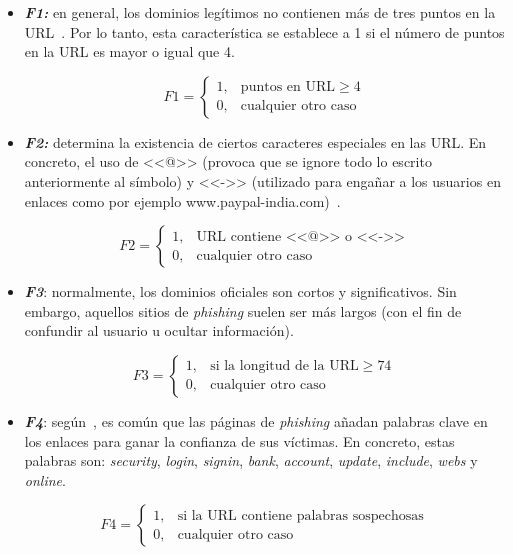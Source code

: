 \begin{itemize}
	\item \textit{\textbf{F1:}} en general, los dominios legítimos no contienen más de tres puntos en la URL~\cite{featuresPhishing2018Gupta}. Por lo tanto, esta característica se establece a 1 si el número de puntos en la URL es mayor o igual que 4.
	
	\[F1 = \left\{ \begin{array}{lr} 1, & \text{puntos en URL} \ge 4\\ 
	0, & \text{cualquier otro caso} \label{eqn:phishing_f1} \end{array} \right. \] 
	
	\item \textit{\textbf{F2:}} determina la existencia de ciertos caracteres especiales en las URL. En concreto, el uso de <<@>> (provoca que se ignore todo lo escrito anteriormente al símbolo) y <<->> (utilizado para engañar a los usuarios en enlaces como por ejemplo www.paypal-india.com)~\cite{featuresPhishing2018Gupta}.
	
	\[F2 = \left\{ \begin{array}{lr} 1, & \text{URL contiene <<@>> o <<->>}\\ 
	0, & \text{cualquier otro caso} \label{eqn:phishing_f2} \end{array} \right. \]
	
	\item \textit{\textbf{F3}}: normalmente, los dominios oficiales son cortos y significativos. Sin embargo, aquellos sitios de \textit{phishing} suelen ser más largos (con el fin de confundir al usuario u ocultar información).
	
	\[F3 = \left\{ \begin{array}{lr} 1, & \text{si la longitud de la URL} \ge 74\\ 
	0, & \text{cualquier otro caso} \label{eqn:phishing_f3} \end{array} \right. \]
	
	\item \textit{\textbf{F4}}: según~\cite{featuresPhishing2018Gupta}, es común que las páginas de \textit{phishing} añadan palabras clave en los enlaces para ganar la confianza de sus víctimas. En concreto, estas palabras son: \textit{security}, \textit{login}, \textit{signin}, \textit{bank}, \textit{account}, \textit{update}, \textit{include}, \textit{webs} y \textit{online}.
	
	\[F4 = \left\{ \begin{array}{lr} 1, & \text{si la URL contiene palabras sospechosas}\\ 
	0, & \text{cualquier otro caso} \label{eqn:phishing_f4} \end{array} \right. \]


\end{itemize}
